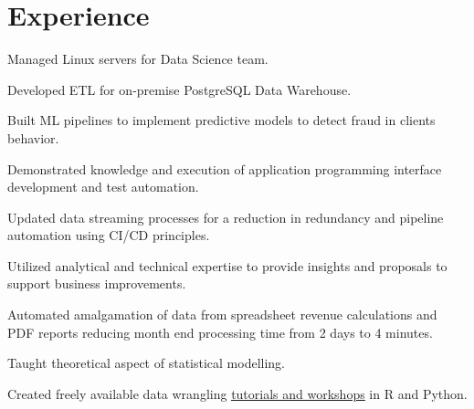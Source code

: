 \documentclass[]{plushcv}
\begin{document}
\begin{minipage}[t]{0.70\textwidth} 



\section{Experience}


\begin{tightemize}
\sectionsep
\sectionsep
\item Managed Linux servers for Data Science team.
\item Developed ETL for on-premise PostgreSQL Data Warehouse.
\item Built ML pipelines to implement predictive models to detect fraud in clients behavior.
\item Demonstrated knowledge and execution of application programming interface development and test automation.
\item Updated data streaming processes for a reduction in redundancy and pipeline automation using CI/CD principles.
\item Utilized analytical and technical expertise to provide insights and proposals to support business improvements.
\item Automated amalgamation of data from spreadsheet revenue calculations and PDF reports reducing month end processing time from 2 days to 4 minutes.
\end{tightemize}
\sectionsep

\begin{tightemize}
\sectionsep
\sectionsep
\item Taught theoretical aspect of statistical modelling.
\item Created freely available data wrangling
\href{https://munoztd0.github.io/Hitchhikers_guide_to_the_brain/}{\underline{tutorials and workshops}} in R and Python.
\end{tightemize}
\sectionsep


\end{minipage}
\end{document}
